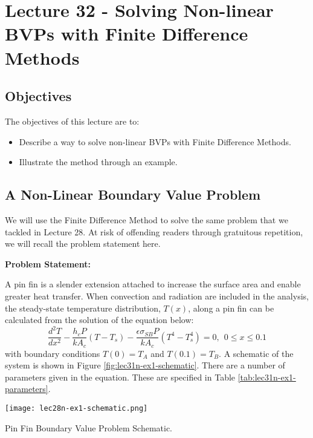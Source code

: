 \chapter{Lecture 32 - Solving Non-linear BVPs with Finite Difference Methods}
\label{ch:lec32n}
\section{Objectives}
The objectives of this lecture are to:
\begin{itemize}
\item Describe a way to solve non-linear BVPs with Finite Difference Methods.
\item Illustrate the method through an example.
\end{itemize}
\setcounter{lstannotation}{0}

\section{A Non-Linear Boundary Value Problem}
We will use the Finite Difference Method to solve the same problem that we tackled in Lecture 28.  At risk of offending readers through gratuitous repetition, we will recall the problem statement here.

\vspace{0.25cm}

\noindent\textbf{Problem Statement:}

\vspace{0.1cm}

\noindent A pin fin is a slender extension attached to increase the surface area and enable greater heat transfer.  When convection and radiation are included in the analysis, the steady-state temperature distribution, $T(x)$, along a pin fin can be calculated from the solution of the equation below:
\begin{equation}
\frac{d^2T}{dx^2} - \frac{h_cP}{kA_c}\left(T - T_s\right)-\frac{\epsilon \sigma_{SB}P}{k A_c}\left(T^4 - T_s^4 \right) = 0, \ \ 0 \le x \le 0.1
\end{equation}
with boundary conditions $T(0)=T_A$ and $T(0.1)=T_B$.  A schematic of the system is shown in Figure \ref{fig:lec31n-ex1-schematic}.  There are a number of parameters given in the equation.  These are specified in Table \ref{tab:lec31n-ex1-parameters}.
\begin{marginfigure}[-4.5cm]
\texttt{[image: lec28n-ex1-schematic.png]}
\caption{Pin Fin Boundary Value Problem Schematic.}
\label{fig:lec31n-ex1-schematic}
\end{marginfigure}

